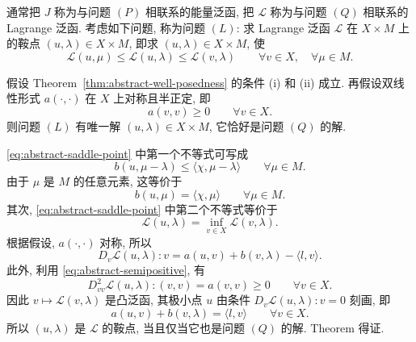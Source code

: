 
通常把 $J$ 称为与问题 $(P)$ 相联系的能量泛函,
把 $\mathcal L$ 称为与问题 $(Q)$ 相联系的 Lagrange 泛函.
考虑如下问题, 称为问题 $(L)$: 求 Lagrange 泛函 $\mathcal L$ 在
$X\times M$ 上的鞍点 $(u,\lambda)\in X\times M$, 即求
$(u,\lambda)\in X\times M$, 使
\begin{equation}\label{eq:abstract-saddle-point}
\mathcal L(u,\mu)\le\mathcal L(u,\lambda)\le\mathcal L(v,\lambda)
\qquad\forall v\in X,\quad\forall\mu\in M.
\end{equation}

\setcounter{statement}{1}
\begin{Theorem}\label{thm:abstract-saddle-equivalence}
假设 Theorem~\ref{thm:abstract-well-posedness} 的条件 (i) 和 (ii) 成立.
再假设双线性形式 $a(\cdot,\cdot)$ 在 $X$ 上对称且半正定, 即
\begin{equation}\label{eq:abstract-semipositive}
a(v,v)\ge0
\qquad\forall v\in X.
\end{equation}
则问题 $(L)$ 有唯一解 $(u,\lambda)\in X\times M$,
它恰好是问题 $(Q)$ 的解.
\end{Theorem}
\begin{Proof}
\eqref{eq:abstract-saddle-point} 中第一个不等式可写成
\[
b(u,\mu-\lambda)\le\langle\chi,\mu-\lambda\rangle
\qquad\forall\mu\in M.
\]
由于 $\mu$ 是 $M$ 的任意元素, 这等价于
\[
b(u,\mu)=\langle\chi,\mu\rangle
\qquad\forall\mu\in M.
\]
其次, \eqref{eq:abstract-saddle-point} 中第二个不等式等价于
\[
\mathcal L(u,\lambda)=\inf_{v\in X}\mathcal L(v,\lambda).
\]
根据假设, $a(\cdot,\cdot)$ 对称, 所以
\[
D_v\mathcal L(u,\lambda)\mathbin{:}v
=a(u,v)+b(v,\lambda)-\langle l,v\rangle.
\]
此外, 利用 
\eqref{eq:abstract-semipositive}, 有
\[
D_{vv}^2\mathcal L(u,\lambda)\mathbin{:}(v,v)
=a(v,v)\ge0
\qquad\forall v\in X.
\]
因此 $v\mapsto\mathcal L(v,\lambda)$ 是凸泛函, 其极小点 $u$ 由条件
$D_v\mathcal L(u,\lambda)\mathbin{:}v=0$ 刻画, 即
\[
a(u,v)+b(v,\lambda)=\langle l,v\rangle
\qquad\forall v\in X.
\]
所以 $(u,\lambda)$ 是 $\mathcal L$ 的鞍点, 当且仅当它也是问题 $(Q)$ 的解.
Theorem 得证.
\end{Proof}

